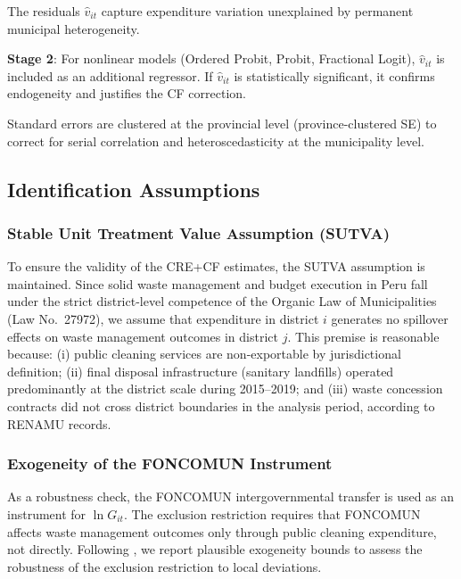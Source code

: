 \noindent The residuals $\hat{v}_{it}$ capture expenditure variation unexplained by permanent municipal heterogeneity.

\textbf{Stage 2}: For nonlinear models (Ordered Probit, Probit, Fractional Logit), $\hat{v}_{it}$ is included as an additional regressor.
If $\hat{v}_{it}$ is statistically significant, it confirms endogeneity and justifies the CF correction.

Standard errors are clustered at the provincial level (province-clustered SE) to correct for serial correlation and heteroscedasticity at the municipality level.

\subsection{Identification Assumptions}
\label{sec:supuestos}

\subsubsection*{Stable Unit Treatment Value Assumption (SUTVA)}

To ensure the validity of the CRE+CF estimates, the SUTVA assumption is maintained.
Since solid waste management and budget execution in Peru fall under the strict district-level competence of the Organic Law of Municipalities (Law No.\ 27972), we assume that expenditure in district $i$ generates no spillover effects on waste management outcomes in district $j$.
This premise is reasonable because: (i) public cleaning services are non-exportable by jurisdictional definition; (ii) final disposal infrastructure (sanitary landfills) operated predominantly at the district scale during 2015--2019; and (iii) waste concession contracts did not cross district boundaries in the analysis period, according to RENAMU records.

\subsubsection*{Exogeneity of the FONCOMUN Instrument}

As a robustness check, the FONCOMUN intergovernmental transfer is used as an instrument for $\ln G_{it}$.
The exclusion restriction requires that FONCOMUN affects waste management outcomes only through public cleaning expenditure, not directly.
Following \citet{ConleyHansenRossi2012}, we report plausible exogeneity bounds to assess the robustness of the exclusion restriction to local deviations.

